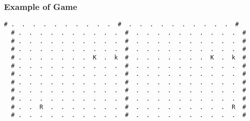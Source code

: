 \documentclass[a4paper]{article}
\begin{document}
\subsubsection{Example of Game}
\begin{Verbatim}[fontsize=\footnotesize]
  # .  .  .  .  .  .  .  .  .  .  #  .  .  .  .  .  .  .  .  .  .  #
  # .  .  .  .  .  .  .  .  .  .  #  .  .  .  .  .  .  .  .  .  .  #
  # .  .  .  .  .  .  .  .  .  .  #  .  .  .  .  .  .  .  .  .  .  #
  # .  .  .  .  .  .  .  .  .  .  #  .  .  .  .  .  .  .  .  .  .  #
  # .  .  .  .  .  .  .  K  .  k  #  .  .  .  .  .  .  .  K  .  k  #
  # .  .  .  .  .  .  .  .  .  .  #  .  .  .  .  .  .  .  .  .  .  #
  # .  .  .  .  .  .  .  .  .  .  #  .  .  .  .  .  .  .  .  .  .  #
  # .  .  .  .  .  .  .  .  .  .  #  .  .  .  .  .  .  .  .  .  .  #
  # .  .  .  .  .  .  .  .  .  .  #  .  .  .  .  .  .  .  .  .  .  #
  # .  .  .  .  .  .  .  .  .  .  #  .  .  .  .  .  .  .  .  .  .  #
  # .  .  R  .  .  .  .  .  .  .  #  .  .  .  .  .  .  .  .  .  R  #
  # .  .  .  .  .  .  .  .  .  .  #  .  .  .  .  .  .  .  .  .  .  #
\end{Verbatim}

\newpage





\end{document}
